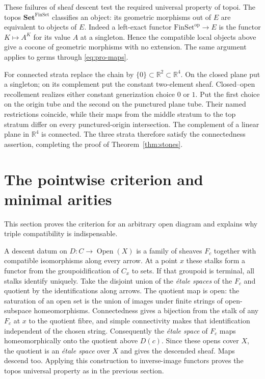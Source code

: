 \documentclass[11pt,a4paper]{article}
\theoremstyle{definition}
\newcommand{\R}{\mathbb R}
\begin{document}
These failures of sheaf descent test the required universal property of topoi. The topos $\mathbf{Set}^{\mathrm{FinSet}}$ classifies an object: its geometric morphisms out of $E$ are equivalent to objects of $E$. Indeed a left-exact functor $\mathrm{FinSet}^{\mathrm{op}}\to E$ is the functor $K\mapsto A^K$ for its value $A$ at a singleton. Hence the compatible local objects above give a cocone of geometric morphisms with no extension. The same argument applies to germs through \eqref{eq:pro-maps}.

For connected strata replace the chain by $\{0\}\subset\R^2\subset\R^4$. On the closed plane put a singleton; on its complement put the constant two-element sheaf. Closed--open recollement realizes either constant generization choice $0$ or $1$. Put the first choice on the origin tube and the second on the punctured plane tube. Their named restrictions coincide, while their maps from the middle stratum to the top stratum differ on every punctured-origin intersection. The complement of a linear plane in $\R^4$ is connected. The three strata therefore satisfy the connectedness assertion, completing the proof of Theorem~\ref{thm:stones}.

\section{The pointwise criterion and minimal arities}
This section proves the criterion for an arbitrary open diagram and explains why triple compatibility is indispensable.

A descent datum on $D:C\to\operatorname{Open}(X)$ is a family of sheaves $F_c$ together with compatible isomorphisms along every arrow. At a point $x$ these stalks form a functor from the groupoidification of $C_x$ to sets. If that groupoid is terminal, all stalks identify uniquely. Take the disjoint union of the \emph{\'etale spaces} of the $F_c$ and quotient by the identifications along arrows. The quotient map is open: the saturation of an open set is the union of images under finite strings of open-subspace homeomorphisms. Connectedness gives a bijection from the stalk of any $F_c$ at $x$ to the quotient fibre, and simple connectivity makes that identification independent of the chosen string. Consequently the \emph{\'etale space} of $F_c$ maps homeomorphically onto the quotient above $D(c)$. Since these opens cover $X$, the quotient is an \emph{\'etale space} over $X$ and gives the descended sheaf. Maps descend too. Applying this construction to inverse-image functors proves the topos universal property as in the previous section.
\end{document}
